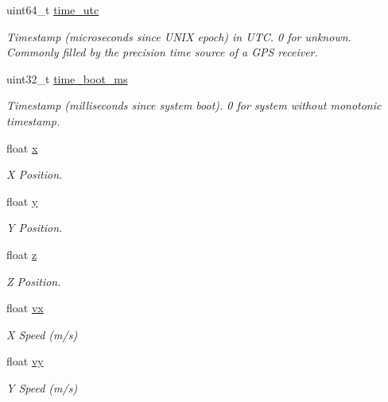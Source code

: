 \begin{DoxyCompactItemize}
\item 
uint64\+\_\+t \hyperlink{struct____mavlink__local__position__ned__cov__t_a92e1d93332591f72a46739755b59dafd}{time\+\_\+utc}
\begin{DoxyCompactList}\small\item\em Timestamp (microseconds since U\+N\+I\+X epoch) in U\+T\+C. 0 for unknown. Commonly filled by the precision time source of a G\+P\+S receiver. \end{DoxyCompactList}\item 
uint32\+\_\+t \hyperlink{struct____mavlink__local__position__ned__cov__t_a624f9a7b76c76c4519d2181884acfdc9}{time\+\_\+boot\+\_\+ms}
\begin{DoxyCompactList}\small\item\em Timestamp (milliseconds since system boot). 0 for system without monotonic timestamp. \end{DoxyCompactList}\item 
float \hyperlink{struct____mavlink__local__position__ned__cov__t_ad8d39ebec25a1bf1b7e9cb527e215954}{x}
\begin{DoxyCompactList}\small\item\em X Position. \end{DoxyCompactList}\item 
float \hyperlink{struct____mavlink__local__position__ned__cov__t_aca5a562fc5facdc16912b2a4adc90adc}{y}
\begin{DoxyCompactList}\small\item\em Y Position. \end{DoxyCompactList}\item 
float \hyperlink{struct____mavlink__local__position__ned__cov__t_a166ffd74c38f3062f8d053eda226e1a4}{z}
\begin{DoxyCompactList}\small\item\em Z Position. \end{DoxyCompactList}\item 
float \hyperlink{struct____mavlink__local__position__ned__cov__t_aa5a686e602e145745222107a3191750d}{vx}
\begin{DoxyCompactList}\small\item\em X Speed (m/s) \end{DoxyCompactList}\item 
float \hyperlink{struct____mavlink__local__position__ned__cov__t_a1fcb3c458660227d4f42570d70505a3f}{vy}
\begin{DoxyCompactList}\small\item\em Y Speed (m/s) \end{DoxyCompactList}\item 

\end{DoxyCompactItemize}
